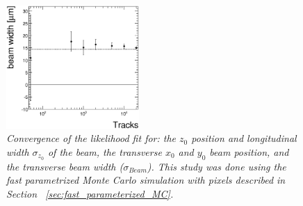 \documentclass{cmspaper}
\begin{document}
\begin{figure}[hbtp]
\begin{center}
        \includegraphics[width=0.45\textwidth]{figures/fxy_lhfit_beamwidth.eps}
    \caption{\it Convergence of the likelihood fit for: the $z_0$ position and longitudinal width  $\sigma_{z_0}$ of the beam, 
                                                        the transverse $x_0$ and $y_0$ beam position, 
                                                        and the transverse beam width ($\sigma_{Beam}$). 
 This study was done using the fast parametrized Monte 
Carlo simulation with pixels described in Section ~\ref{sec:fast_parameterized_MC}.
                                                         }
    \label{fig:performance_dz}
  \end{center}
\end{figure}



\end{document}
